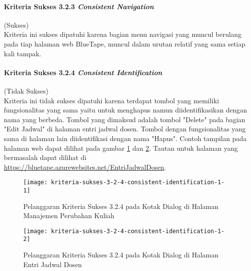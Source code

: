 \paragraph{Kriteria Sukses 3.2.3 \textit{Consistent Navigation}}
\label{par:kepatuhan_bluetape_kriteria_sukses_3.2.3}
(Sukses)\\

Kriteria ini sukses dipatuhi karena bagian menu navigasi yang muncul berulang pada tiap halaman web BlueTape, muncul dalam urutan relatif yang sama setiap kali tampak.

\paragraph{Kriteria Sukses 3.2.4 \textit{Consistent Identification}}
\label{par:kepatuhan_bluetape_kriteria_sukses_3.2.4}
(Tidak Sukses)\\

Kriteria ini tidak sukses dipatuhi karena terdapat tombol yang memiliki fungsionalitas yang sama yaitu untuk menghapus namun diidentifikasikan dengan nama yang berbeda. Tombol yang dimaksud adalah tombol "Delete" pada bagian "Edit Jadwal" di halaman entri jadwal dosen. Tombol dengan fungsionalitas yang sama di halaman lain diidentifikasi dengan nama "Hapus". Contoh tampilan pada halaman web dapat dilihat pada gambar \ref{fig:3.2.4_consistent_identification_1} dan \ref{fig:3.2.4_consistent_identification_2}. Tautan untuk halaman yang bermasalah dapat dilihat di \url{https://bluetape.azurewebsites.net/EntriJadwalDosen}.

\begin{figure}[H]
    \centering  
    \texttt{[image: kriteria-sukses-3-2-4-consistent-identification-1-1]}  
    \caption[Pelanggaran Kriteria Sukses 3.2.4 pada Kotak Dialog di Halaman Manajemen Perubahan Kuliah]{Pelanggaran Kriteria Sukses 3.2.4 pada Kotak Dialog di Halaman Manajemen Perubahan Kuliah}
    \label{fig:3.2.4_consistent_identification_1}  
\end{figure}

\begin{figure}[H]
    \centering  
    \texttt{[image: kriteria-sukses-3-2-4-consistent-identification-1-2]}  
    \caption[Pelanggaran Kriteria Sukses 3.2.4 pada Kotak Dialog di Halaman Entri Jadwal Dosen]{Pelanggaran Kriteria Sukses 3.2.4 pada Kotak Dialog di Halaman Entri Jadwal Dosen}
    \label{fig:3.2.4_consistent_identification_2}  
\end{figure}

